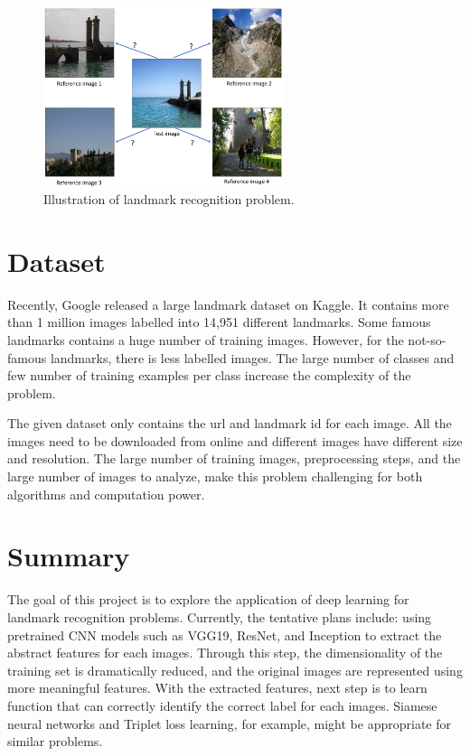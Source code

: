 \documentclass{article}
\begin{document}
\begin{figure}[htbp]
\centering
\includegraphics[width=7.0cm]{./figures/sample.pdf}
\caption{Illustration of landmark recognition problem.}
\label{fig:example}
\end{figure}

\section{Dataset}
\label{sec:dataset}
Recently, Google released a large landmark dataset on Kaggle. It contains more than 1 million images labelled into 14,951 different landmarks. Some famous landmarks contains a huge number of training images. However, for the not-so-famous landmarks, there is less labelled images. The large number of classes and few number of training examples per class increase the complexity of the problem.

The given dataset only contains the url and landmark id for each image. All the images need to be downloaded from online and different images have different size and resolution. The large number of training images, preprocessing steps, and the large number of images to analyze, make this problem challenging for both algorithms and computation power.


\section{Summary}
\label{sec:summary}

The goal of this project is to explore the application of deep learning for landmark recognition problems. Currently, the tentative plans include: using pretrained CNN models such as VGG19, ResNet, and Inception to extract the abstract features for each images. Through this step, the dimensionality of the training set is dramatically reduced, and the original images are represented using more meaningful features. With the extracted features, next step is to learn function that can correctly identify the correct label for each images. Siamese neural networks and Triplet loss learning, for example, might be appropriate for similar problems.
\end{document}

